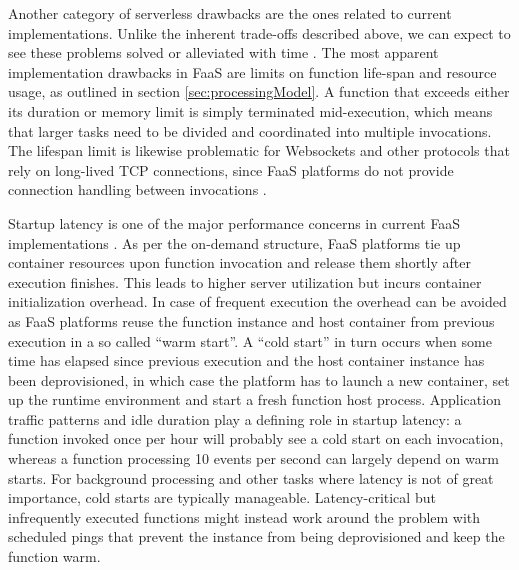 Another category of serverless drawbacks are the ones related to current implementations. Unlike the inherent trade-offs described above, we can expect to see these problems solved or alleviated with time \parencite{robert2016serverlessarchitectures}. The most apparent implementation drawbacks in FaaS are limits on function life-span and resource usage, as outlined in section \ref{sec:processingModel}. A function that exceeds either its duration or memory limit is simply terminated mid-execution, which means that larger tasks need to be divided and coordinated into multiple invocations. The lifespan limit is likewise problematic for Websockets and other protocols that rely on long-lived TCP connections, since FaaS platforms do not provide connection handling between invocations \parencite{hendrickson16openlambda}.

Startup latency is one of the major performance concerns in current FaaS implementations \parencite{cncf18serverlessWG}. As per the on-demand structure, FaaS platforms tie up container resources upon function invocation and release them shortly after execution finishes. This leads to higher server utilization but incurs container initialization overhead. In case of frequent execution the overhead can be avoided as FaaS platforms reuse the function instance and host container from previous execution in a so called ``warm start''. A ``cold start'' in turn occurs when some time has elapsed since previous execution and the host container instance has been deprovisioned, in which case the platform has to launch a new container, set up the runtime environment and start a fresh function host process. Application traffic patterns and idle duration play a defining role in startup latency: a function invoked once per hour will probably see a cold start on each invocation, whereas a function processing 10 events per second can largely depend on warm starts. For background processing and other tasks where latency is not of great importance, cold starts are typically manageable. Latency-critical but infrequently executed functions might instead work around the problem with scheduled pings that prevent the instance from being deprovisioned and keep the function warm. \parencite{robert2016serverlessarchitectures}

